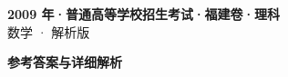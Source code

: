 \documentclass[zihao=-4, a4paper]{ctexart}
\begin{document}
\begin{center}
  {\Large\bfseries 2009 年·普通高等学校招生考试·福建卷·理科}\\[4pt]
  {\large 数学 · 解析版}
\end{center}
\medskip
{}

\clearpage
{}
\begin{center}{\Large\bfseries 参考答案与详细解析}\end{center}
\medskip

\end{document}
